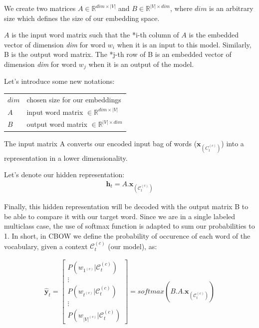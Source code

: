 We create two matrices $A \in \mathbb{R}^{dim \times |V|}$ and $B \in \mathbb{R}^{|V| \times dim}$, where $dim$ is an arbitrary size which defines the size of our embedding space.

$A$ is the input word matrix such that the *i-th column of $A$ is the embedded vector of dimension \textit{dim} for word $w_{i}$ when it is an input to this model. 
Similarly, B is the output word matrix. The *j-th row of B is an embedded vector of dimension \textit{dim} for word $w_j$ when it is an output of the model. 


Let's introduce some new notations:

{\ttfamily
\begin{table}[H]
    \centering
    \begin{tabular}{ll}
        \toprule
        $dim$ 				& chosen size for our embeddings \\
        $A$ 				& input word matrix $\in \mathbb{R}^{dim \times |V|}$ \\
        $B$ 				& output word matrix $\in \mathbb{R}^{|V| \times dim}$ \\
        \bottomrule
    \end{tabular}
\end{table}
}

The input matrix A converts our encoded input bag of words ($\mathbf{x}_{(C_t^{(c)})}$) into a representation in a lower dimensionality.

Let's denote our hidden representation:
\begin{align}
 \mathbf{h}_t = A.\mathbf{x}_{(\mathcal{C}_t^{(c)})}
\end{align}

Finally, this hidden representation will be decoded with the output matrix B to be able to compare it with our target word. Since we are in a single labeled multiclass case, the use of softmax function is adapted to sum our probabilities to 1. In short, in CBOW we define the probability of occurence of each word of the vocabulary, given a context $\mathcal{C}_t^{(c)}$ (our model), as:

\begin{align}
 \mathbf{\hat y}_t = 
	\begin{bmatrix} 
		P(w_{1^{(v)}} | \mathcal{C}_t^{(c)}) \\
		\vdots \\
		P(w_{t^{(v)}} | \mathcal{C}_t^{(c)})\\
		\vdots \\
		P(w_{|V|^{(v)}} | \mathcal{C}_t^{(c)})
	\end{bmatrix} = 
	softmax(B.A.\mathbf{x}_{(\mathcal{C}_t^{(c)})})
\end{align}

